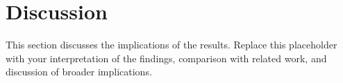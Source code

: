 
\section{Discussion}


This section discusses the implications of the results.
Replace this placeholder with your interpretation of the findings,
comparison with related work, and discussion of broader implications.
